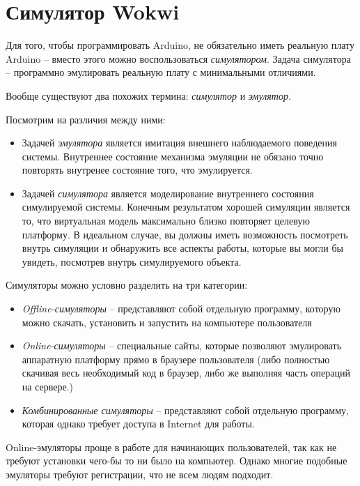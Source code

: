 \documentclass[../sparc.tex]{subfiles}
\begin{document}
\section{Симулятор Wokwi}
Для того, чтобы программировать Arduino, не обязательно иметь реальную плату
Arduino -- вместо этого можно воспользоваться \emph{симулятором}.  Задача
симулятора -- программно эмулировать реальную плату с минимальными отличиями.

Вообще существуют два похожих термина: \emph{симулятор} и \emph{эмулятор}.

Посмотрим на различия\cite{so:simulator-vs-emulator} между ними:
\begin{itemize}
\item Задачей \emph{эмулятора} является имитация внешнего наблюдаемого поведения
  системы.  Внутреннее состояние механизма эмуляции не обязано точно повторять
  внутренее состояние того, что эмулируется.
\item Задачей \emph{симулятора} является моделирование внутреннего состояния
  симулируемой системы.  Конечным результатом хорошей симуляции является то, что
  виртуальная модель максимально близко повторяет целевую платформу.  В
  идеальном случае, вы должны иметь возможность посмотреть внутрь симуляции и
  обнаружить все аспекты работы, которые вы могли бы увидеть, посмотрев внутрь
  симулируемого объекта.
\end{itemize}

Симуляторы можно условно разделить на три категории:
\begin{itemize}
\item \emph{Offline-симуляторы} -- представляют собой отдельную программу,
  которую можно скачать, установить и запустить на компьютере пользователя
\item \emph{Online-симуляторы} -- специальные сайты, которые позволяют эмулировать
  аппаратную платформу прямо в браузере пользователя (либо полностью скачивая
  весь необходимый код в браузер, либо же выполняя часть операций на сервере.)
\item \emph{Комбинированные симуляторы} -- представляют собой отдельную
  программу, которая однако требует доступа в Internet для работы.
\end{itemize}

Online-эмуляторы проще в работе для начинающих пользователей, так как не требуют
установки чего-бы то ни было на компьютер.  Однако многие подобные эмуляторы
требуют регистрации, что не всем людям подходит.
\end{document}
